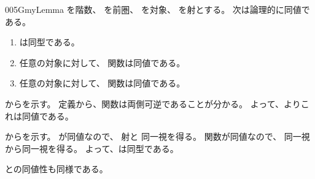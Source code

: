 \documentclass[index]{subfiles}
\begin{document}
\begin{myBlock}{005G}{myLemma}
  を階数、
  を前圏、
  を対象、
  を射とする。
  次は論理的に同値である。
  \begin{enumerate}
  \item \label{005G:0000} は同型である。
  \item \label{005G:0001} 任意の対象に対して、
    関数は同値である。
  \item \label{005G:0002} 任意の対象に対して、
    関数は同値である。
  \end{enumerate}
\end{myBlock}
\StartDefiningTabulars
\begin{myProof}
  からを示す。
  定義から、関数は両側可逆であることが分かる。
  よって、よりこれは同値である。

  からを示す。
  が同値なので、
  射と
  同一視を得る。
  関数が同値なので、
  同一視から同一視を得る。
  よって、は同型である。

  との同値性も同様である。
\end{myProof}
\StopDefiningTabulars
\end{document}
